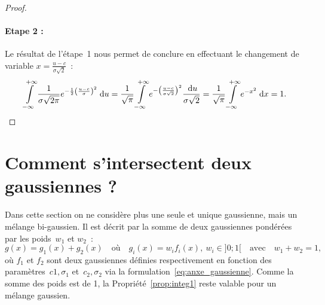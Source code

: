 \documentclass[main.tex]{subfiles}
\begin{document}
\begin{proof}
\paragraph{Etape 2 :} Le résultat de l'étape~1 nous permet de conclure  en effectuant le changement de variable $x=\frac{u-c}{\sigma \sqrt{2}}$~:
\begin{equation*}
 \int\limits_{-\infty}^{+\infty} \frac{1}{\sigma\sqrt{2\pi}} e^{-\frac{1}{2}\left(\frac{u-c}{\sigma}\right)^2} \;{\rm d}u
= \frac{1}{\sqrt{\pi}} \int\limits_{-\infty}^{+\infty} e^{-\left(\frac{u-c}{\sigma \sqrt{2}}\right)^2} \frac{\;{\rm d}u}{\sigma\sqrt{2}} =\frac{1}{\sqrt{\pi}} \int\limits_{-\infty}^{+\infty} e^{-x^2} \;{\rm d}x = 1.
\end{equation*}
\end{proof}


\section{Comment s'intersectent deux gaussiennes ?}
Dans cette section on ne considère plus une seule et unique gaussienne, mais un mélange bi-gaussien. Il est décrit par la somme de deux gaussiennes pondérées par les poids~$w_1$ et $w_2$~:
\begin{equation}
\label{eq:anxe_bi_gauss}
g(x)= g_1(x)+ g_2(x) \quad \textrm{où} \quad g_i(x)=w_if_i(x), \ w_i\in ]0;1[  \quad \textrm{avec} \quad w_1 + w_2=1,
\end{equation}
où $f_1$ et $f_2$ sont deux gaussiennes définies respectivement en fonction des paramètres~$c1,\sigma_1$ et~$c_2,\sigma_2$ via la formulation~\eqref{eq:anxe_gaussienne}. Comme la somme des poids est de 1, la Propriété~\ref{prop:integ1} reste valable pour un mélange gaussien.
\end{document}
